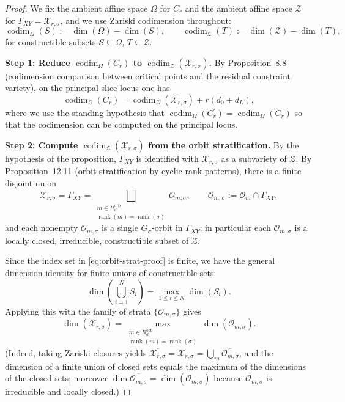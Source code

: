 \documentclass{article}
\newcommand{\rank}{\operatorname{rank}}
\newcommand{\codim}{\operatorname{codim}}
\theoremstyle{definition}
\begin{document}
\begin{proof}
We fix the ambient affine space $\Omega$ for $C_r$ and the ambient affine space $\mathcal Z$ for $\Gamma_{XY}=\mathcal X_{r,\sigma}$, and we use
Zariski codimension throughout:
\[
\codim_{\Omega}(S):=\dim(\Omega)-\dim(S),\qquad
\codim_{\mathcal Z}(T):=\dim(\mathcal Z)-\dim(T),
\]
for constructible subsets $S\subseteq \Omega$, $T\subseteq \mathcal Z$.

\medskip
\noindent\textbf{Step 1: Reduce $\codim_{\Omega}(C_r)$ to $\codim_{\mathcal Z}(\mathcal X_{r,\sigma})$.}
By Proposition~8.8 (codimension comparison between critical points and the residual constraint variety), on the principal slice locus one has
\begin{equation}\label{eq:codim-Cr-vs-Xrsigma-proof}
\codim_{\Omega}(C_r)
=
\codim_{\mathcal Z}(\mathcal X_{r,\sigma})
+
r(d_0+d_L),
\end{equation}
where we use the standing hypothesis that $\codim_{\Omega}(C_r^\circ)=\codim_{\Omega}(C_r)$ so that the codimension can be computed on the principal locus.

\medskip
\noindent\textbf{Step 2: Compute $\codim_{\mathcal Z}(\mathcal X_{r,\sigma})$ from the orbit stratification.}
By the hypothesis of the proposition, $\Gamma_{XY}$ is identified with $\mathcal X_{r,\sigma}$ as a subvariety of $\mathcal Z$. By Proposition~12.11 (orbit stratification by cyclic rank patterns), there is a finite disjoint union
\begin{equation}\label{eq:orbit-strat-proof}
\mathcal X_{r,\sigma}
=
\Gamma_{XY}
=
\bigsqcup_{\substack{m\in R_d^{\mathrm{orb}}\\ \rank(m)=\rank(\sigma)}}
\mathcal O_{m,\sigma},
\qquad
\mathcal O_{m,\sigma}:=\mathcal O_m\cap \Gamma_{XY},
\end{equation}
and each nonempty $\mathcal O_{m,\sigma}$ is a single $G_\sigma$-orbit in $\Gamma_{XY}$; in particular each $\mathcal O_{m,\sigma}$ is a locally closed, irreducible, constructible subset of $\mathcal Z$.

Since the index set in \eqref{eq:orbit-strat-proof} is finite, we have the general dimension identity for finite unions of constructible sets:
\[
\dim\!\left(\bigcup_{i=1}^N S_i\right) = \max_{1\le i\le N}\dim(S_i).
\]
Applying this with the family of strata $\{\mathcal O_{m,\sigma}\}$ gives
\begin{equation}\label{eq:dim-X-maxorbit-proof}
\dim(\mathcal X_{r,\sigma})
=
\max_{\substack{m\in R_d^{\mathrm{orb}}\\ \rank(m)=\rank(\sigma)}}
\dim(\mathcal O_{m,\sigma}).
\end{equation}
(Indeed, taking Zariski closures yields
$\overline{\mathcal X_{r,\sigma}}=\mathcal X_{r,\sigma}=\bigcup_m \overline{\mathcal O_{m,\sigma}}$, and the dimension of a finite union of closed sets equals the maximum of the dimensions of the closed sets; moreover $\dim\overline{\mathcal O_{m,\sigma}}=\dim(\mathcal O_{m,\sigma})$ because $\mathcal O_{m,\sigma}$ is irreducible and locally closed.)


\end{proof}
\end{document}
